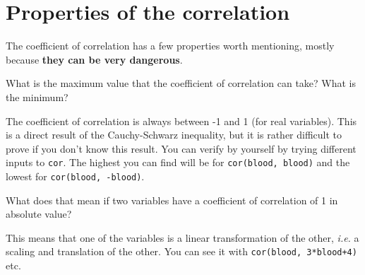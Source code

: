 \documentclass[a4paper]{article}
\theoremstyle{definition}
\begin{document}
\section{Properties of the correlation}

The coefficient of correlation has a few properties worth mentioning,
mostly because \textbf{they can be very dangerous}.

\begin{Exercise}
What is the maximum value that the coefficient of correlation can take?
What is the minimum?
\end{Exercise}
\begin{Answer}
The coefficient of correlation is always between -1 and 1 (for real
variables). This is a direct result of the Cauchy-Schwarz inequality,
but it is rather difficult to prove if you don't know this result.
You can verify by yourself by trying different inputs to
\texttt{cor}. The highest you can find will be for
\texttt{cor(blood, blood)} and the lowest for \texttt{cor(blood, -blood)}.
\end{Answer}

\begin{Exercise}
What does that mean if two variables have a coefficient of correlation of
1 in absolute value?
\end{Exercise}
\begin{Answer}
This means that one of the variables is a linear transformation of the
other, \textit{i.e.} a scaling and translation of the other. You can see
it with \texttt{cor(blood, 3*blood+4)} etc.
\end{Answer}
\end{document}
